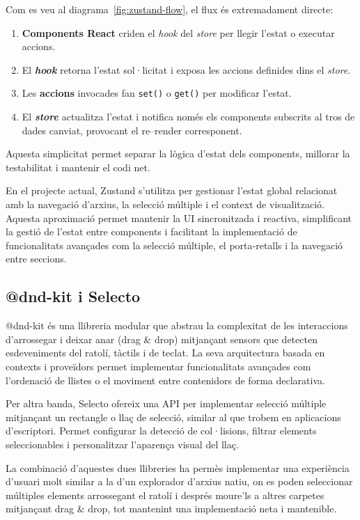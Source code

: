 Com es veu al diagrama~\ref{fig:zustand-flow}, el flux és extremadament directe:

\begin{enumerate}[label=\arabic*.]
  \item \textbf{Components React} criden el \textit{hook} del \textit{store} per llegir l'estat o executar accions.
  \item El \textbf{\textit{hook}} retorna l'estat sol·licitat i exposa les accions definides dins el \textit{store}.
  \item Les \textbf{accions} invocades fan \verb|set()| o \verb|get()| per modificar l'estat.
  \item El \textbf{\textit{store}} actualitza l'estat i notifica només els components subscrits al tros de dades canviat, provocant el re–render corresponent.
\end{enumerate}

Aquesta simplicitat permet separar la lògica d'estat dels components, millorar la testabilitat i mantenir el codi net. 

En el projecte actual, Zustand s'utilitza per gestionar l'estat global relacionat amb la navegació d'arxius, la selecció múltiple i el context de visualització. Aquesta aproximació permet mantenir la UI sincronitzada i reactiva, simplificant la gestió de l'estat entre components i facilitant la implementació de funcionalitats avançades com la selecció múltiple, el porta-retalls i la navegació entre seccions.

\subsection*{@dnd-kit i Selecto}
@dnd-kit és una llibreria modular que abstrau la complexitat de les interaccions d'arrossegar i deixar anar (drag \& drop) mitjançant sensors que detecten esdeveniments del ratolí, tàctils i de teclat. La seva arquitectura basada en contexts i proveïdors permet implementar funcionalitats avançades com l'ordenació de llistes o el moviment entre contenidors de forma declarativa.

Per altra banda, Selecto ofereix una API per implementar selecció múltiple mitjançant un rectangle o llaç de selecció, similar al que trobem en aplicacions d'escriptori. Permet configurar la detecció de col·lisions, filtrar elements seleccionables i personalitzar l'aparença visual del llaç.

La combinació d'aquestes dues llibreries ha permès implementar una experiència d'usuari molt similar a la d'un explorador d'arxius natiu, on es poden seleccionar múltiples elements arrossegant el ratolí i després moure'ls a altres carpetes mitjançant drag \& drop, tot mantenint una implementació neta i mantenible.

